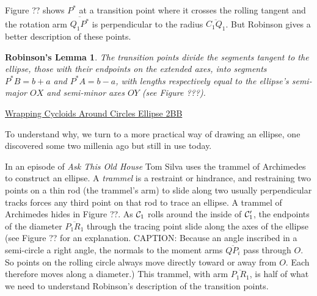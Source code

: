 \documentclass{ximera}
\newtheorem{theorem21}{Robinson's Lemma}
\begin{document}

Figure ?? shows $P^*$ at a transition point where it crosses the rolling tangent and the rotation arm $\overline{Q_1P^*}$ is perpendicular to the radius $\overline{C_1Q_1}$. But Robinson gives a better description of these points.

\begin{theorem21}
The transition points divide the segments tangent to the ellipse, those with their endpoints on the extended axes, into segments $P^*B = b+a$ and $P^*A = b-a$, with lengths respectively equal to the ellipse's semi-major $OX$ and semi-minor axes $OY$ (see Figure ???).
\end{theorem21}

\begin{onlineOnly}
    \begin{center}
\end{center}
\end{onlineOnly}

\href{https://www.desmos.com/calculator/2afbtinzyu}{Wrapping Cycloids Around Circles Ellipse 2BB}

To understand why, we turn to a more practical way of drawing an ellipse, one discovered some two millenia ago but still in use today.

In an episode of \emph{Ask This Old House} Tom Silva uses the trammel of Archimedes to construct an ellipse. A \emph{trammel} is a restraint or hindrance, and restraining two points on a thin rod (the trammel's arm) to slide along two usually perpendicular tracks forces any third point on that rod to trace an ellipse. A trammel of Archimedes hides in Figure ??. As ${\cal C}_1$ rolls around the inside of ${\cal C}_1^\prime$, the endpoints of the diameter $\overline{P_1R_1}$ through the tracing point slide along the axes of the ellipse (see Figure ?? for an explanation. CAPTION: Because an angle inscribed in a semi-circle a right angle, the normals to the moment arms $\overline{QP_i}$ pass through $O$. So points on the rolling circle always move directly toward or away from $O$. Each therefore moves along a diameter.) This trammel, with arm $\overline{P_1R_1}$, is half of what we need to understand Robinson's description of the transition points.
\end{document}
